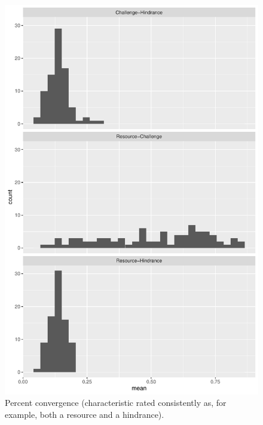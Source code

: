\documentclass[
  man]{apa6}
\begin{document}
\begin{figure}
\centering
\includegraphics{SIOP2024convergence_files/figure-latex/percagree-1.pdf}
\caption{\label{fig:percagree}Percent convergence (characteristic rated consistently as, for example, both a resource and a hindrance).}
\end{figure}
\end{document}
